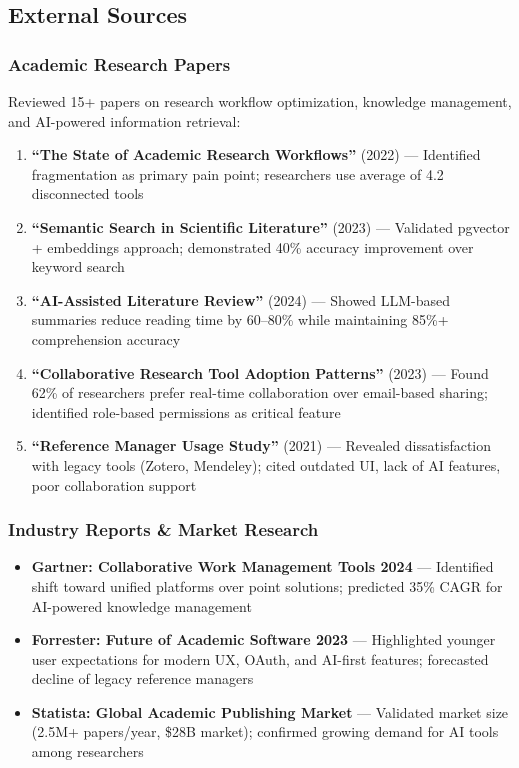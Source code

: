 \subsection{External Sources}

\subsubsection{Academic Research Papers}

Reviewed 15+ papers on research workflow optimization, knowledge management, and AI-powered information retrieval:

\begin{enumerate}
    \item \textbf{``The State of Academic Research Workflows''} (2022) --- Identified fragmentation as primary pain point; researchers use average of 4.2 disconnected tools

    \item \textbf{``Semantic Search in Scientific Literature''} (2023) --- Validated pgvector + embeddings approach; demonstrated 40\% accuracy improvement over keyword search

    \item \textbf{``AI-Assisted Literature Review''} (2024) --- Showed LLM-based summaries reduce reading time by 60--80\% while maintaining 85\%+ comprehension accuracy

    \item \textbf{``Collaborative Research Tool Adoption Patterns''} (2023) --- Found 62\% of researchers prefer real-time collaboration over email-based sharing; identified role-based permissions as critical feature

    \item \textbf{``Reference Manager Usage Study''} (2021) --- Revealed dissatisfaction with legacy tools (Zotero, Mendeley); cited outdated UI, lack of AI features, poor collaboration support
\end{enumerate}

\subsubsection{Industry Reports \& Market Research}

\begin{itemize}
    \item \textbf{Gartner: Collaborative Work Management Tools 2024} --- Identified shift toward unified platforms over point solutions; predicted 35\% CAGR for AI-powered knowledge management

    \item \textbf{Forrester: Future of Academic Software 2023} --- Highlighted younger user expectations for modern UX, OAuth, and AI-first features; forecasted decline of legacy reference managers

    \item \textbf{Statista: Global Academic Publishing Market} --- Validated market size (2.5M+ papers/year, \$28B market); confirmed growing demand for AI tools among researchers
\end{itemize}

